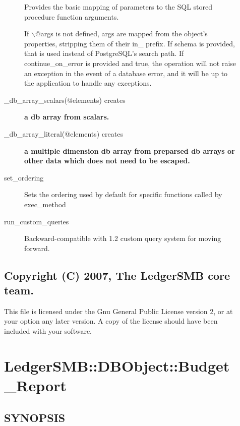 \begin{description}
\begin{description}
Provides the basic mapping of parameters to the SQL stored procedure function 
arguments.



If $\backslash$@args is not defined, args are mapped from the object's properties, 
stripping them of their in\_ prefix.  If schema is provided, that is used 
instead of PostgreSQL's search path.  If continue\_on\_error is provided and true,
the operation will not raise an exception in the event of a database error, and 
it will be up to the application to handle any exceptions.


\item[{\_db\_array\_scalars(@elements) creates}] \textbf{a db array from scalars.}
\item[{\_db\_array\_literal(@elements) creates}] \textbf{a multiple dimension db array from 	preparsed db arrays or other data which does not need to be escaped.}
\item[{set\_ordering}] \mbox{}

Sets the ordering used by default for specific functions called by exec\_method


\item[{run\_custom\_queries}] \mbox{}

Backward-compatible with 1.2 custom query system for moving forward.

\end{description}
\subsection*{Copyright (C) 2007, The LedgerSMB core team.\label{LedgerSMB::DBObject_Copyright_C_2007_The_LedgerSMB_core_team_}}


This file is licensed under the Gnu General Public License version 2, or at your
option any later version.  A copy of the license should have been included with
your software.

\section{LedgerSMB::DBObject::Budget\_Report\label{LedgerSMB::DBObject::Budget_Report}}




\subsection*{SYNOPSIS\label{LedgerSMB::DBObject::Budget_Report_SYNOPSIS}}



\end{description}
